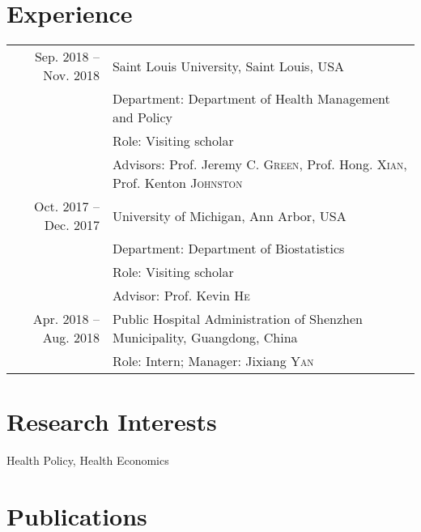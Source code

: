 \documentclass[a4paper,10pt]{article}
\begin{document}
\section{Experience}
\begin{tabular}{rl}
  Sep. 2018  -- Nov. 2018 & Saint Louis University, Saint Louis, USA\\
& \small Department: Department of Health Management and Policy\\
& \small Role: Visiting scholar\\
& \small Advisors: Prof. Jeremy C. \textsc{Green}, Prof. Hong. \textsc{Xian}, Prof. Kenton \textsc{Johnston}\\
 Oct. 2017  --  Dec. 2017 & University of Michigan, Ann Arbor, USA\\
& \small Department: Department of Biostatistics\\
& \small Role: Visiting scholar\\
& \small Advisor: Prof. Kevin \textsc{He}\\
 Apr. 2018 -- Aug. 2018 & Public Hospital Administration of Shenzhen Municipality, Guangdong, China \\
 & Role: Intern; Manager: Jixiang \textsc{Yan} \\
\end{tabular}

\section{Research Interests}
Health Policy, Health Economics

\section{Publications}
\end{document}
